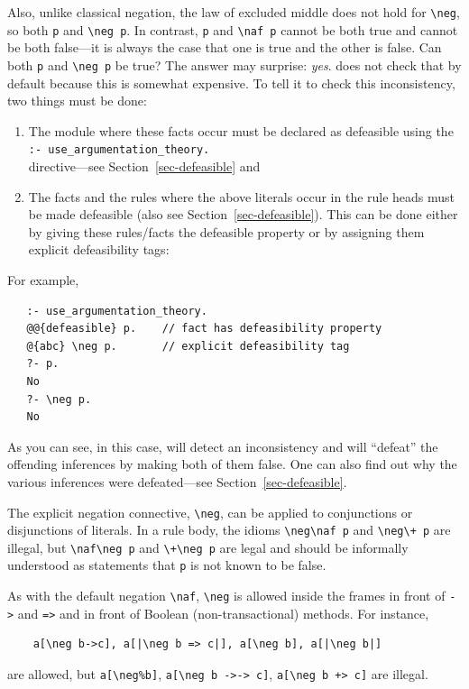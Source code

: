 \documentclass[11pt]{article}
\newcommand{\ERGO}{\mbox{\smaller{\ensuremath{\cal{E}}\smaller{{\sc{RGO}}}}}\xspace}
\newcommand{\FLSYSTEM}{\ERGO}
\newcommand{\bs}{\textbackslash}
\newcommand{\PLGNAF}{\mbox{\texttt{\bs}+}\xspace}
\newcommand{\RULELOGNAF}{{\texttt{{\bs}naf}}\xspace}
\newcommand{\RULELOGNEG}{{\texttt{{\bs}neg}}\xspace}
\begin{document}
Also, unlike classical negation, the law of excluded middle does not hold
for {\tt \RULELOGNEG}, so both \texttt{p} and \texttt{\RULELOGNEG p}.  In
contrast, \texttt{p} and \texttt{\RULELOGNAF p} cannot be both true and
cannot be both false---it is always the case that one is true and the other
is false. Can both \texttt{p} and \texttt{\RULELOGNEG p} be true?   
The answer may surprise: \emph{yes}. \FLSYSTEM does not check that by
default because this is somewhat expensive.
To tell it to check this inconsistency, two things must be done:
\begin{enumerate}
\item  The module where these facts occur must be declared as defeasible
  using the\\
  \texttt{:- use\_argumentation\_theory.}\\
  directive---see
  Section~\ref{sec-defeasible} and
\item The facts and the rules where the above literals occur in the rule
  heads must be made
  defeasible (also see Section~\ref{sec-defeasible}).
  This can be done either by giving these rules/facts the defeasible
  property or by assigning them explicit defeasibility tags:
\end{enumerate}
For example,
\begin{verbatim}
   :- use_argumentation_theory.
   @@{defeasible} p.    // fact has defeasibility property
   @{abc} \neg p.       // explicit defeasibility tag
   ?- p.
   No
   ?- \neg p.
   No
\end{verbatim}
As you can see, in this case, \FLSYSTEM will detect an inconsistency and
will ``defeat'' the offending inferences by making both of them false. One can also find
out why the various inferences were defeated---see
Section~\ref{sec-defeasible}.

The explicit negation connective, {\tt \RULELOGNEG}, can be applied to
conjunctions or disjunctions of literals.
In a rule body, the idioms {\tt \RULELOGNEG \RULELOGNAF p} and {\tt \RULELOGNEG \PLGNAF p} are
illegal, but {\tt \RULELOGNAF \RULELOGNEG p} and {\tt \PLGNAF \RULELOGNEG p} are legal and should be
informally understood as statements that {\tt p} is not known to be false. 

As with the default negation \RULELOGNAF, {\tt \RULELOGNEG} is allowed inside the
frames 
in front of {\tt ->} and {\tt =>} and in front of
Boolean (non-transactional) methods. For instance,
\begin{verbatim}
    a[\neg b->c], a[|\neg b => c|], a[\neg b], a[|\neg b|]
\end{verbatim}
are allowed, but {\tt a[\RULELOGNEG \%b]}, {\tt a[\RULELOGNEG b ->-> c]}, {\tt a[\RULELOGNEG b
  +> c]} are illegal.  
\end{document}
